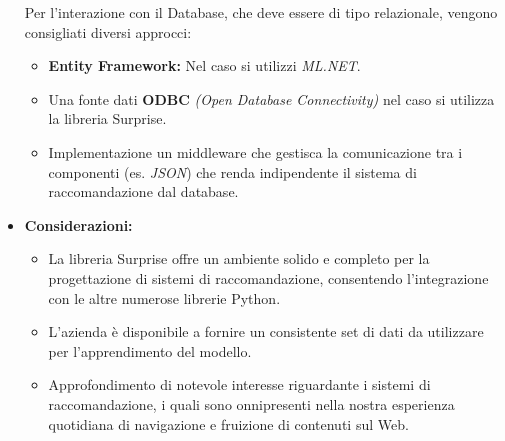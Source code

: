 \documentclass{article}
\begin{document}
\begin{itemize}
    Per l'interazione con il Database, che deve essere di tipo relazionale, vengono consigliati diversi approcci: 
        
    \begin{itemize}
    \item \textbf{Entity Framework:} Nel caso si utilizzi \textit{ML.NET}.
    \item Una fonte dati \textbf{ODBC} \textit{(Open Database Connectivity)} nel caso si utilizza la libreria Surprise.
    \item Implementazione un middleware che gestisca la comunicazione tra i componenti (es. \textit{JSON}) che renda indipendente il sistema di raccomandazione dal database.

    \end{itemize}
    
    \item[] \textbf{Considerazioni:}
    \begin{itemize}
        \item La libreria Surprise offre un ambiente solido e completo per la progettazione di sistemi di raccomandazione, consentendo l’integrazione con le altre numerose librerie Python.
        \item L’azienda è disponibile a fornire un consistente set di dati da utilizzare per l’apprendimento del modello.
        \item Approfondimento di notevole interesse riguardante i sistemi di raccomandazione, i quali sono onnipresenti nella nostra esperienza quotidiana di navigazione e fruizione di contenuti sul Web.
    \end{itemize} 

\end{itemize}
\pagebreak

\end{document}
